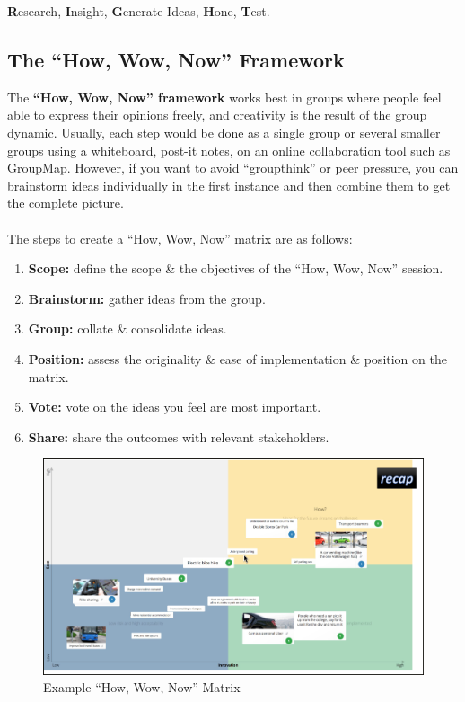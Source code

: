 \documentclass[a4paper,11pt]{article}
\begin{document}
\begin{center}
    \textbf{R}esearch, \textbf{I}nsight, \textbf{G}enerate Ideas, \textbf{H}one, \textbf{T}est.
\end{center}

\subsection{The ``How, Wow, Now'' Framework}
The \textbf{``How, Wow, Now'' framework} works best in groups where people feel able to express their 
opinions freely, and creativity is the result of the group dynamic.
Usually, each step would be done as a single group or several smaller groups using a whiteboard, post-it notes,
on an online collaboration tool such as GroupMap.
However, if you want to avoid ``groupthink'' or peer pressure, you can brainstorm ideas individually in the 
first instance and then combine them to get the complete picture.
\\\\
The steps to create a ``How, Wow, Now'' matrix are as follows:
\begin{enumerate}
    \item   \textbf{Scope:} define the scope \& the objectives of the ``How, Wow, Now'' session.
    \item   \textbf{Brainstorm:} gather ideas from the group.
    \item   \textbf{Group:} collate \& consolidate ideas.
    \item   \textbf{Position:} assess the originality \& ease of implementation \& position on the matrix.
    \item   \textbf{Vote:} vote on the ideas you feel are most important.
    \item   \textbf{Share:} share the outcomes with relevant stakeholders.
\end{enumerate}

\begin{figure}[H]
    \centering
    \includegraphics[width=\textwidth]{images/howwownowmatrix.png}
    \caption{Example ``How, Wow, Now'' Matrix}
\end{figure}
\end{document}
